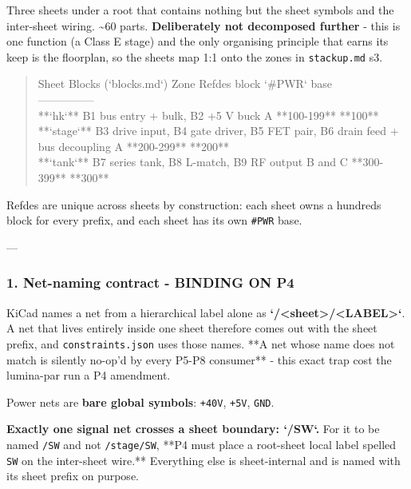 \documentclass[11pt,a4paper]{article}
\begin{document}
Three sheets under a root that contains nothing but the sheet symbols and the inter-sheet wiring. \textasciitilde{}60 parts. \textbf{Deliberately not decomposed further} - this is one function (a Class E stage) and the only organising principle that earns its keep is the floorplan, so the sheets map 1:1 onto the zones in \texttt{stackup.md} s3.

\begin{quote}\small\ttfamily\raggedright
\textbar{} Sheet \textbar{} Blocks (`blocks.md`) \textbar{} Zone \textbar{} Refdes block \textbar{} `\#PWR` base \textbar{}\\
\textbar{}---\textbar{}---\textbar{}---\textbar{}---\textbar{}---\textbar{}\\
\textbar{} {*}{*}`hk`{*}{*} \textbar{} B1 bus entry + bulk, B2 +5 V buck \textbar{} A \textbar{} {*}{*}100-199{*}{*} \textbar{} {*}{*}100{*}{*} \textbar{}\\
\textbar{} {*}{*}`stage`{*}{*} \textbar{} B3 drive input, B4 gate driver, B5 FET pair, B6 drain feed + bus decoupling \textbar{} A \textbar{} {*}{*}200-299{*}{*} \textbar{} {*}{*}200{*}{*} \textbar{}\\
\textbar{} {*}{*}`tank`{*}{*} \textbar{} B7 series tank, B8 L-match, B9 RF output \textbar{} B and C \textbar{} {*}{*}300-399{*}{*} \textbar{} {*}{*}300{*}{*} \textbar{}
\end{quote}
Refdes are unique across sheets by construction: each sheet owns a hundreds block for every prefix, and each sheet has its own \texttt{\#PWR} base.

---

\subsubsection*{1. Net-naming contract - BINDING ON P4}
KiCad names a net from a hierarchical label alone as \textbf{`/\textless{}sheet\textgreater{}/\textless{}LABEL\textgreater{}`}. A net that lives entirely inside one sheet therefore comes out with the sheet prefix, and \texttt{constraints.json} uses those names. {*}{*}A net whose name does not match is silently no-op'd by every P5-P8 consumer{*}{*} - this exact trap cost the lumina-par run a P4 amendment.

Power nets are \textbf{bare global symbols}: \texttt{+40V}, \texttt{+5V}, \texttt{GND}.

\textbf{Exactly one signal net crosses a sheet boundary: `/SW`.} For it to be named \texttt{/SW} and not \texttt{/stage/SW}, {*}{*}P4 must place a root-sheet local label spelled \texttt{SW} on the inter-sheet wire.{*}{*} Everything else is sheet-internal and is named with its sheet prefix on purpose.
\end{document}
